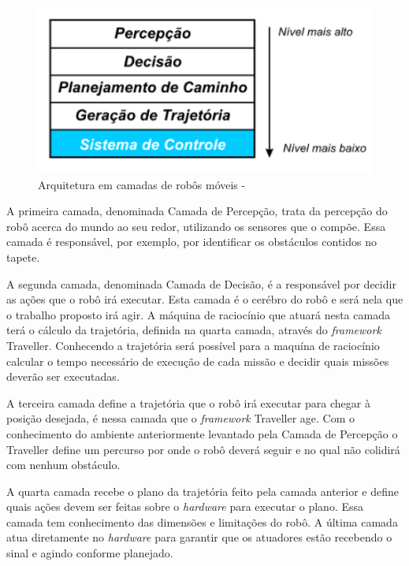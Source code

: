 \FloatBarrier
\begin{figure}[!h]
\centering
\includegraphics[keepaspectratio=true,scale=0.5]{figuras/arquiteturaCamadas.png}
\caption{Arquitetura em camadas de robôs móveis - }
\label{arquiteturaCamadas}
\end{figure}

A primeira camada, denominada Camada de Percepção, trata da percepção do robô acerca do mundo ao seu redor, utilizando os sensores que o compõe. Essa camada é responsável, por exemplo, por identificar os obstáculos contidos no tapete.

A segunda camada, denominada Camada de Decisão, é a responsável por decidir as ações que o robô irá executar. Esta camada é o cerébro do robô e será nela que o trabalho proposto irá agir. A máquina de raciocínio que atuará nesta camada terá o cálculo da trajetória, definida na 	quarta camada, através do \textit{framework} Traveller. Conhecendo a trajetória será possível para a maquína de raciocínio calcular o tempo necessário de execução de cada missão e decidir quais missões deverão ser executadas.

A terceira camada define a trajetória que o robô irá executar para chegar à posição desejada, é nessa camada que o \textit{framework} Traveller age. Com o conhecimento do ambiente anteriormente levantado pela Camada de Percepção o Traveller define um percurso por onde o robô deverá seguir e no qual não colidirá com nenhum obstáculo.

A quarta camada recebe o plano da trajetória feito pela camada anterior e define quais ações devem ser feitas sobre o \textit{hardware} para executar o plano. Essa camada tem conhecimento das dimensões e limitações do robô. A última camada atua diretamente no \textit{hardware} para garantir que os atuadores estão recebendo o sinal e agindo conforme planejado.
 
